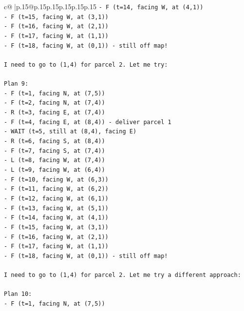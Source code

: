 \documentclass{article}
\begin{document}
{\begin{supertabular}{c@{$\;$}|p{.15\linewidth}@{}p{.15\linewidth}p{.15\linewidth}p{.15\linewidth}p{.15\linewidth}p{.15\linewidth}}
{{{\texttt{{-} F (t=14, facing W, at (4,1))} \\
\texttt{{-} F (t=15, facing W, at (3,1))} \\
\texttt{{-} F (t=16, facing W, at (2,1))} \\
\texttt{{-} F (t=17, facing W, at (1,1))} \\
\texttt{{-} F (t=18, facing W, at (0,1)) {-} still off map!} \\
\\ 
\texttt{I need to go to (1,4) for parcel 2. Let me try:} \\
\\ 
\texttt{Plan 9:} \\
\texttt{{-} F (t=1, facing N, at (7,5))} \\
\texttt{{-} F (t=2, facing N, at (7,4))} \\
\texttt{{-} R (t=3, facing E, at (7,4))} \\
\texttt{{-} F (t=4, facing E, at (8,4)) {-} deliver parcel 1} \\
\texttt{{-} WAIT (t=5, still at (8,4), facing E)} \\
\texttt{{-} R (t=6, facing S, at (8,4))} \\
\texttt{{-} F (t=7, facing S, at (7,4))} \\
\texttt{{-} L (t=8, facing W, at (7,4))} \\
\texttt{{-} L (t=9, facing W, at (6,4))} \\
\texttt{{-} F (t=10, facing W, at (6,3))} \\
\texttt{{-} F (t=11, facing W, at (6,2))} \\
\texttt{{-} F (t=12, facing W, at (6,1))} \\
\texttt{{-} F (t=13, facing W, at (5,1))} \\
\texttt{{-} F (t=14, facing W, at (4,1))} \\
\texttt{{-} F (t=15, facing W, at (3,1))} \\
\texttt{{-} F (t=16, facing W, at (2,1))} \\
\texttt{{-} F (t=17, facing W, at (1,1))} \\
\texttt{{-} F (t=18, facing W, at (0,1)) {-} still off map!} \\
\\ 
\texttt{I need to go to (1,4) for parcel 2. Let me try a different approach:} \\
\\ 
\texttt{Plan 10:} \\
\texttt{{-} F (t=1, facing N, at (7,5))} \\
}}}
\end{supertabular}}
\end{document}

